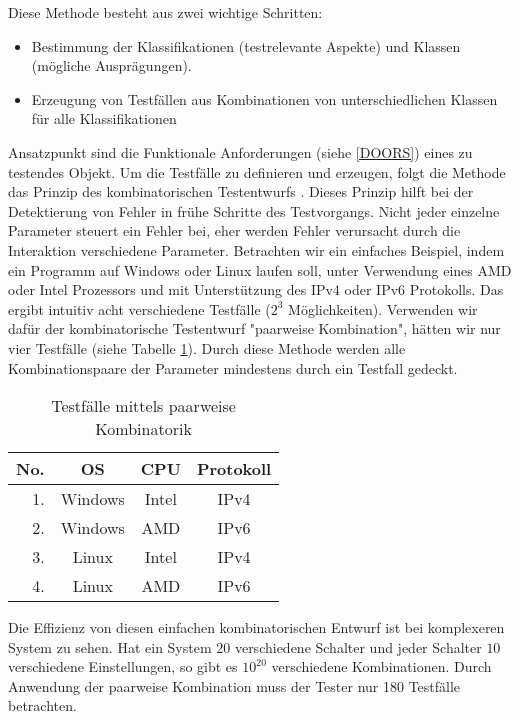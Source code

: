  Diese Methode besteht aus zwei wichtige Schritten:
\begin{itemize}
\item Bestimmung der Klassifikationen (testrelevante Aspekte) und Klassen (mögliche Ausprägungen).
\item Erzeugung von Testfällen aus Kombinationen von unterschiedlichen Klassen für alle Klassifikationen
\end{itemize}

Ansatzpunkt sind die Funktionale Anforderungen (siehe \ref{DOORS}) eines zu testendes Objekt. Um die Testfälle zu definieren und erzeugen, folgt die Methode das Prinzip des kombinatorischen Testentwurfs \cite{KlassifikationsbaumMethode}. Dieses Prinzip hilft bei der Detektierung von Fehler in frühe Schritte des Testvorgangs. Nicht jeder einzelne Parameter steuert ein Fehler bei, eher werden Fehler verursacht durch die Interaktion verschiedene Parameter. Betrachten wir ein einfaches Beispiel, indem ein Programm auf Windows oder Linux laufen soll, unter Verwendung eines AMD oder Intel Prozessors und mit Unterstützung des IPv4 oder IPv6 Protokolls. Das ergibt intuitiv acht verschiedene Testfälle ($2^{3}$ Möglichkeiten). Verwenden wir dafür der kombinatorische Testentwurf "paarweise Kombination", hätten wir nur vier Testfälle (siehe Tabelle \ref{table:4TestCases}). Durch diese Methode werden alle Kombinationspaare der Parameter mindestens durch ein Testfall gedeckt\cite{CombinatorialSTesting}.



\begin{table}
\begin{center}
	\begin{tabular}{|r||c|c|c|}
	 \hline
	 No. &OS &CPU &Protokoll\\
	 \hline
	 1. &Windows &Intel &IPv4\\
	 \hline
	 2. &Windows &AMD &IPv6\\
	 \hline
	 3. &Linux &Intel &IPv4\\
	 \hline
	 4. &Linux &AMD &IPv6\\
	 \hline
	\end{tabular}
	
	\caption{Testfälle mittels paarweise Kombinatorik}
	\label{table:4TestCases}
\end{center}
\end{table}


Die Effizienz von diesen einfachen kombinatorischen Entwurf ist bei komplexeren System zu sehen. Hat ein System $20$ verschiedene Schalter und jeder Schalter $10$ verschiedene Einstellungen, so gibt es $10^{20}$ verschiedene Kombinationen. Durch Anwendung der paarweise Kombination muss der Tester nur 180 Testfälle betrachten.\\

